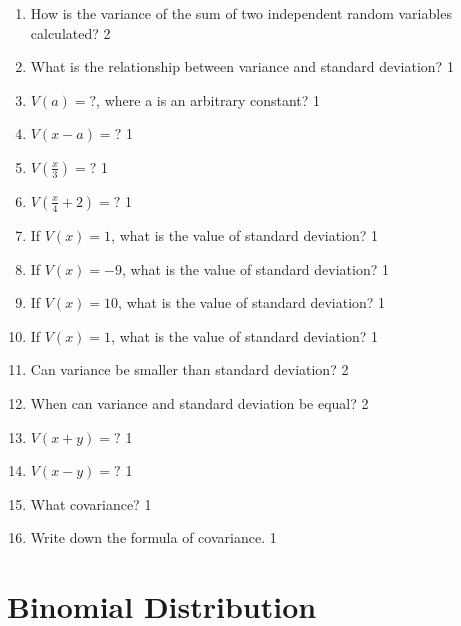 \documentclass[a4paper,oneside, margin=1.4in]{book}
\begin{document}
\begin{enumerate}
\item How is the variance of the sum of two independent random variables calculated? \hfill 2

\item What is the relationship between variance and standard deviation? \hfill 1

\item $V(a) = ?$, where a is an arbitrary constant?  \hfill 1

\item $V(x-a) = ?$  \hfill 1

\item $V(\frac x3) = ?$  \hfill 1

\item $V(\frac x4 + 2) = ?$  \hfill 1

\item If $V(x) = 1$, what is the value of standard deviation? \hfill 1

\item If $V(x) = -9$, what is the value of standard deviation? \hfill 1

\item If $V(x) = 10$, what is the value of standard deviation? \hfill 1

\item If $V(x) = 1$, what is the value of standard deviation? \hfill 1

\item Can variance be smaller than standard deviation? \hfill 2

\item When can variance and standard deviation be equal? \hfill 2

\item $V(x + y)=?$ \hfill 1

\item $V(x - y)=?$ \hfill 1

\item What covariance? \hfill 1

\item Write down the formula of covariance. \hfill 1


\end{enumerate}

\chapter{Binomial Distribution} 
\end{document}
